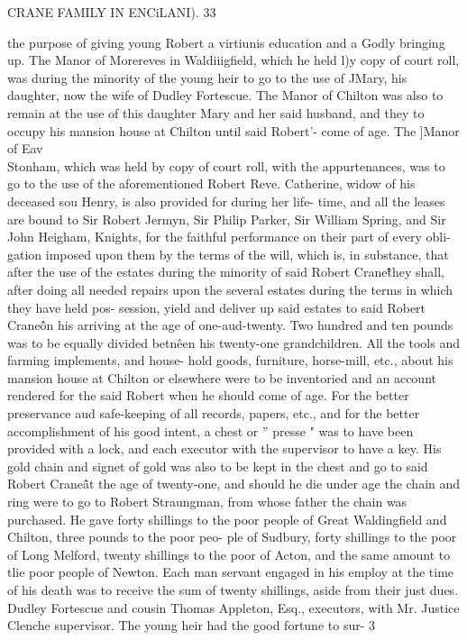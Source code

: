 CRANE FAMILY IN ENCiLANI). 33 

the purpose of giving young Robert a virtiunis education and a 
Godly bringing up. The Manor of Morereves in Waldiiigfield, 
which he held l)y copy of court roll, was during the minority of 
the young heir to go to the use of JMary, his daughter, now the 
wife of Dudley Fortescue. The Manor of Chilton was also to 
remain at the use of this daughter Mary and her said husband, 
and they to occupy his mansion house at Chilton until said 
Robert'- come of age. The ]Manor of Eav\\ Stonham, which 
was held by copy of court roll, with the appurtenances, was to go 
to the use of the aforementioned Robert Reve. Catherine, widow 
of his deceased sou Henry, is also provided for during her life- 
time, and all the leases are bound to Sir Robert Jermyn, Sir 
Philip Parker, Sir William Spring, and Sir John Heigham, 
Knights, for the faithful performance on their part of every obli- 
gation imposed upon them by the terms of the will, which is, in 
substance, that after the use of the estates during the minority of 
said Robert Crane\^\^ they shall, after doing all needed repairs upon 
the several estates during the terms in which they have held pos- 
session, yield and deliver up said estates to said Robert Crane\^\^ 
on his arriving at the age of one-aud-twenty. Two hundred and 
ten pounds was to be equally divided betn\^een his twenty-one 
grandchildren. All the tools and farming implements, and house- 
hold goods, furniture, horse-mill, etc., about his mansion house 
at Chilton or elsewhere were to be inventoried and an account 
rendered for the said Robert when he should come of age. For 
the better preservance aud safe-keeping of all records, papers, etc., 
and for the better accomplishment of his good intent, a chest or 
'' presse " was to have been provided with a lock, and each executor 
with the supervisor to have a key. His gold chain and signet of 
gold was also to be kept in the chest and go to said Robert Crane\^\^ 
at the age of twenty-one, and should he die under age the chain 
and ring were to go to Robert Straungman, from whose father the 
chain was purchased. He gave forty shillings to the poor people 
of Great Waldingfield and Chilton, three pounds to the poor peo- 
ple of Sudbury, forty shillings to the poor of Long Melford, 
twenty shillings to the poor of Acton, and the same amount to 
tlie poor people of Newton. Each man servant engaged in his 
employ at the time of his death was to receive the sum of twenty 
shillings, aside from their just dues. Dudley Fortescue and 
cousin Thomas Appleton, Esq., executors, with Mr. Justice 
Clenche supervisor. The young heir had the good fortune to sur- 
3 



